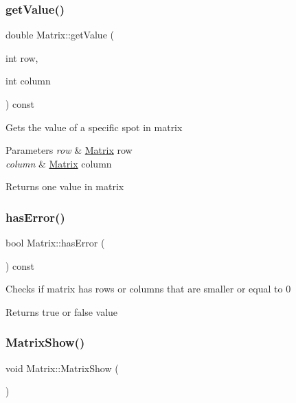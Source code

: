 \subsubsection{\texorpdfstring{get\+Value()}{getValue()}}
{\footnotesize\ttfamily double Matrix\+::get\+Value (\begin{DoxyParamCaption}\item[{int}]{row,  }\item[{int}]{column }\end{DoxyParamCaption}) const}

Gets the value of a specific spot in matrix 
\begin{DoxyParams}{Parameters}
{\em row} & \hyperlink{classMatrix}{Matrix} row \\
\hline
{\em column} & \hyperlink{classMatrix}{Matrix} column \\
\hline
\end{DoxyParams}
\begin{DoxyReturn}{Returns}
one value in matrix 
\end{DoxyReturn}
\mbox{\label{classMatrix_abf6343d2b9345e08ef800fbc8f19e34e}} 
\subsubsection{\texorpdfstring{has\+Error()}{hasError()}}
{\footnotesize\ttfamily bool Matrix\+::has\+Error (\begin{DoxyParamCaption}{ }\end{DoxyParamCaption}) const}

Checks if matrix has rows or columns that are smaller or equal to 0 \begin{DoxyReturn}{Returns}
true or false value 
\end{DoxyReturn}
\mbox{\label{classMatrix_a3c6fbdb8a8073ec2b2000614777ae930}} 
\subsubsection{\texorpdfstring{Matrix\+Show()}{MatrixShow()}}
{\footnotesize\ttfamily void Matrix\+::\+Matrix\+Show (\begin{DoxyParamCaption}{ }\end{DoxyParamCaption})\hspace{0.3cm}{\ttfamily [inline]}}

